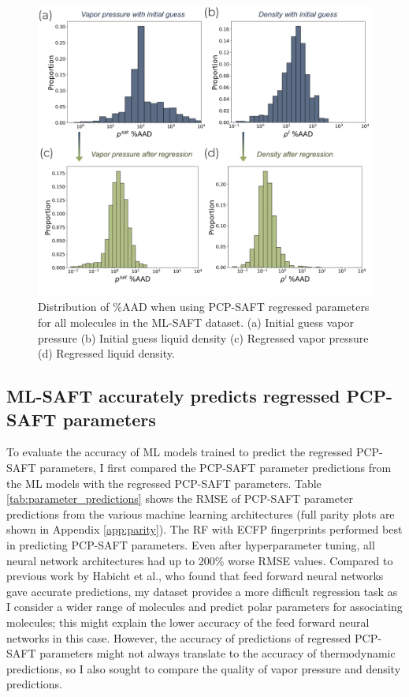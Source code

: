 \begin{figure}
    \centering
    \includegraphics[width=\textwidth]{gfx/Chapter08/regression_errors.png}
    \caption{Distribution of \%AAD  when using PCP-SAFT regressed parameters for all molecules in the ML-SAFT dataset. (a) Initial guess vapor pressure (b) Initial guess liquid density (c) Regressed vapor pressure (d) Regressed liquid density.}
    \label{fig:regression_errors}
\end{figure}

\subsection{ML-SAFT accurately predicts regressed PCP-SAFT parameters}

To evaluate the accuracy of ML models trained to predict the regressed PCP-SAFT parameters, I first compared the PCP-SAFT parameter predictions from the ML models with the regressed PCP-SAFT parameters. Table \ref{tab:parameter_predictions} shows the RMSE of PCP-SAFT parameter predictions from the various machine learning architectures (full parity plots are shown in Appendix \ref{app:parity}). The RF with ECFP fingerprints performed best in predicting PCP-SAFT parameters. Even after hyperparameter tuning, all neural network architectures had up to 200\% worse RMSE values. Compared to previous work by Habicht et al., who found that feed forward neural networks gave accurate predictions, my dataset provides a more difficult regression task as I consider a wider range of molecules and predict polar parameters for associating molecules; this might explain the lower accuracy of the feed forward neural networks in this case. However, the accuracy of predictions of regressed PCP-SAFT parameters might not always translate to the accuracy of thermodynamic predictions, so I also sought to compare the quality of vapor pressure and density predictions.

